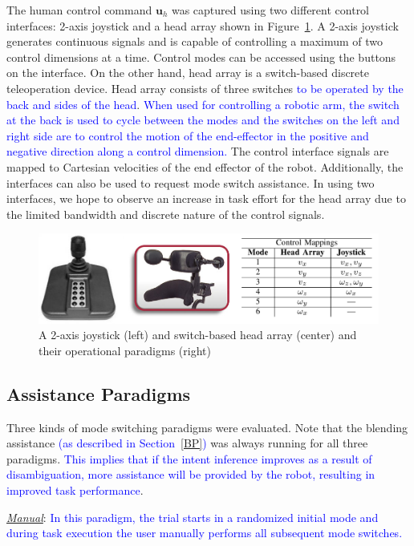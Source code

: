 \documentclass[conference]{IEEEtran}
\begin{document}
 The human control command $\boldsymbol{u}_h$ was captured using two different control interfaces: 2-axis joystick and a head array shown in Figure~\ref{J2_HA}. 
 A 2-axis joystick generates continuous signals and is capable of controlling a maximum of two control dimensions at a time. Control modes can be accessed using the buttons on the interface. 
 On the other hand, head array  is a switch-based discrete teleoperation device. Head array consists of three switches \textcolor{blue}{to be operated by the back and sides of the head}. \textcolor{blue}{When used for controlling a robotic arm, the switch at the back is used to cycle between the modes and the switches on the left and right side are to control the motion of the end-effector in the positive and negative direction along a control dimension.}
 The control interface signals are mapped to Cartesian velocities of the end effector of the robot. Additionally, the interfaces can also be used to request mode switch assistance. In using two interfaces, we hope to observe an increase in task effort for the head array due to the limited bandwidth and discrete nature of the control signals.
   \begin{figure}[h]
 	\centering
 	\includegraphics[width = 0.9\hsize, height = 0.16\vsize]{./figures/INTER.png}
 	\caption{A 2-axis joystick (left) and switch-based head array (center) and their operational paradigms (right)}
 	\label{J2_HA}
 \end{figure}
 \subsection{Assistance Paradigms}
 Three kinds of mode switching paradigms were evaluated. Note that the blending assistance \textcolor{blue}{(as described in Section~\ref{BP})} was always running for all three paradigms. \textcolor{blue}{This implies that if the intent inference improves as a result of disambiguation, more assistance will be provided by the robot, resulting in improved task performance}. 
 
 \noindent\underline{\textit{Manual}}: \textcolor{blue}{In this paradigm, \textcolor{blue}{the trial starts in a randomized initial mode} and during task execution the user manually performs all subsequent mode switches.}
 
\end{document}
